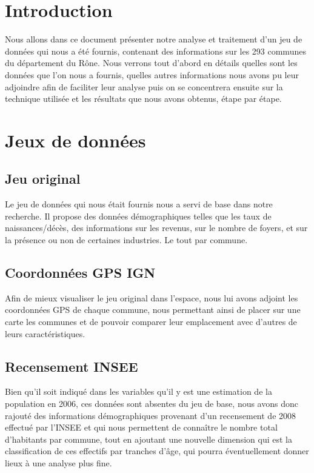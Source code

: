 \section{Introduction}

Nous allons dans ce document présenter notre analyse et traitement d'un jeu de données qui nous a été fournis, contenant des informations sur les 293 communes du département du Rône. Nous verrons tout d'abord en détails quelles sont les données que l'on nous a fournis, quelles autres informations nous avons pu leur adjoindre afin de faciliter leur analyse puis on se concentrera ensuite sur la technique utilisée et les résultats que nous avons obtenus, étape par étape.

\section{Jeux de données}

\subsection{Jeu original}

Le jeu de données qui nous était fournis nous a servi de base dans notre recherche. Il propose des données démographiques telles que les taux de naissances/décès, des informations sur les revenus, sur le nombre de foyers, et sur la présence ou non de certaines industries. Le tout par commune.

\subsection{Coordonnées GPS IGN}

Afin de mieux visualiser le jeu original dans l'espace, nous lui avons adjoint les coordonnées GPS de chaque commune, nous permettant ainsi de placer sur une carte les communes et de pouvoir comparer leur emplacement avec d'autres de leurs caractéristiques.

\subsection{Recensement INSEE}
Bien qu'il soit indiqué dans les variables qu'il y est une estimation de la population en 2006, ces données sont absentes du jeu de base, nous avons donc rajouté des informations démographiques provenant d'un recensement de 2008 effectué par l'INSEE et qui nous permettent de connaître le nombre total d'habitants par commune, tout en ajoutant une nouvelle dimension qui est la classification de ces effectifs par tranches d'âge, qui pourra éventuellement donner lieux à une analyse plus fine.

